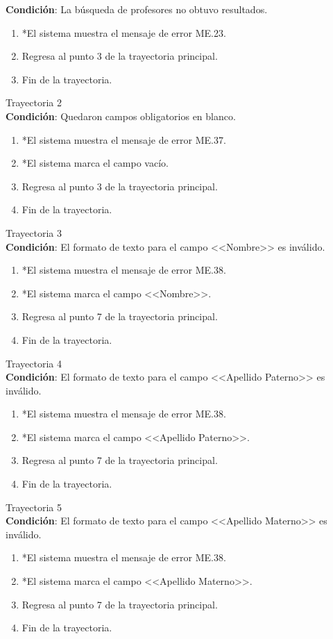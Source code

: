 \textbf{Condición}: La búsqueda de profesores no obtuvo resultados.
\begin{enumerate}
	\item *El sistema muestra el mensaje de error ME.23.
	\item Regresa al punto 3 de la trayectoria principal.
	\item Fin de la trayectoria.
\end{enumerate}
\large{Trayectoria 2}\\
\textbf{Condición}: Quedaron campos obligatorios en blanco.
\begin{enumerate}
	\item *El sistema muestra el mensaje de error ME.37.
	\item *El sistema marca el campo vacío.
	\item Regresa al punto 3 de la trayectoria principal.
	\item Fin de la trayectoria.
\end{enumerate}
\large{Trayectoria 3}\\
\textbf{Condición}: El formato de texto para el campo <<Nombre>> es inválido.
\begin{enumerate}
	\item *El sistema muestra el mensaje de error ME.38.
	\item *El sistema marca el campo <<Nombre>>.
	\item Regresa al punto 7 de la trayectoria principal.
	\item Fin de la trayectoria.
\end{enumerate}
\large{Trayectoria 4}\\
\textbf{Condición}: El formato de texto para el campo <<Apellido Paterno>> es inválido.
\begin{enumerate}
	\item *El sistema muestra el mensaje de error ME.38.
	\item *El sistema marca el campo <<Apellido Paterno>>.
	\item Regresa al punto 7 de la trayectoria principal.
	\item Fin de la trayectoria.
\end{enumerate}
\large{Trayectoria 5}\\
\textbf{Condición}: El formato de texto para el campo <<Apellido Materno>> es inválido.
\begin{enumerate}
	\item *El sistema muestra el mensaje de error ME.38.
	\item *El sistema marca el campo <<Apellido Materno>>.
	\item Regresa al punto 7 de la trayectoria principal.
	\item Fin de la trayectoria.
\end{enumerate}
